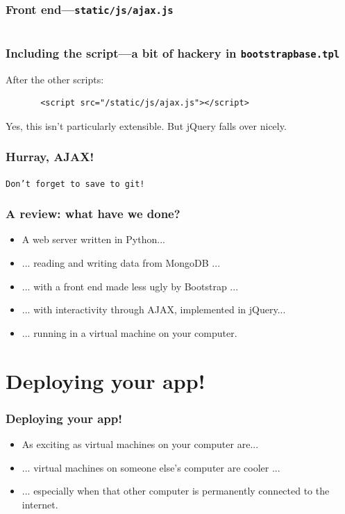 \documentclass{beamer}
\begin{document}
\begin{frame}
  \frametitle{Front end---\texttt{static/js/ajax.js}}
  \inputminted{js}{../steps/03-frontend/04-demo-app/static/js/ajax.js}
\end{frame}

\begin{frame}[fragile]
  \frametitle{Including the script---a bit of hackery in
    \texttt{bootstrapbase.tpl}}
  
  After the other scripts:
  \begin{verbatim}
       <script src="/static/js/ajax.js"></script>
  \end{verbatim}

  Yes, this isn't particularly extensible. But jQuery falls over
  nicely.
\end{frame}

\begin{frame}
  \frametitle{Hurray, AJAX!}

  \texttt{Don't forget to save to git!}
\end{frame}

\begin{frame}
  \frametitle{A review: what have we done?}
  \begin{itemize}
  \item A web server written in Python...
  \item ... reading and writing data from MongoDB ...
  \item ... with a front end made less ugly by Bootstrap ...
  \item ... with interactivity through AJAX, implemented in jQuery...
  \item ... running in a virtual machine on your computer.
  \end{itemize}
\end{frame}

\section{Deploying your app!}

\begin{frame}
  \frametitle{Deploying your app!}
  \begin{itemize}
  \item As exciting as virtual machines on your computer are...
  \item ... virtual machines on someone else's computer are cooler ...
  \item ... especially when that other computer is permanently
    connected to the internet.
  \end{itemize}
\end{frame}
\end{document}
